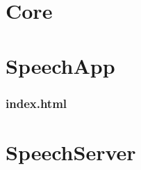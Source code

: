 \part{Core}
	\setcounter{chapter}{0}
	
	
	
	
	
	
\part{SpeechApp}
	\setcounter{chapter}{0}
	
	\section{index.html}
	
	
\part{SpeechServer}
	\setcounter{chapter}{0}
	